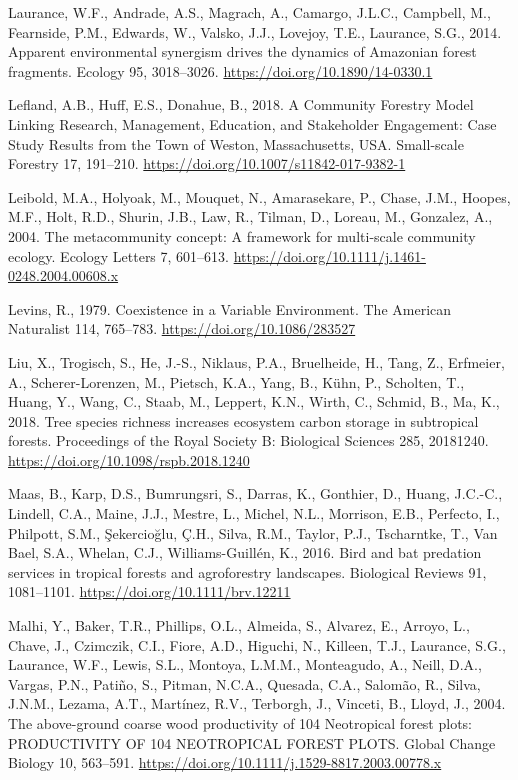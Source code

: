 \documentclass[
  12pt,
]{article}
\newlength{\cslhangindent}
\newlength{\cslentryspacingunit} %
\newenvironment{CSLReferences}[2] %
 {%
  \setlength{\parindent}{0pt}
  \ifodd #1
  \let\oldpar\par
  \def\par{\hangindent=\cslhangindent\oldpar}
  \fi
  \setlength{\parskip}{#2\cslentryspacingunit}
 }%
 {}
\begin{document}
\begin{CSLReferences}{1}{0}
\leavevmode{}%
Laurance, W.F., Andrade, A.S., Magrach, A., Camargo, J.L.C., Campbell, M., Fearnside, P.M., Edwards, W., Valsko, J.J., Lovejoy, T.E., Laurance, S.G., 2014. Apparent environmental synergism drives the dynamics of {Amazonian} forest fragments. Ecology 95, 3018--3026. \url{https://doi.org/10.1890/14-0330.1}

\leavevmode{}%
Lefland, A.B., Huff, E.S., Donahue, B., 2018. A {Community Forestry Model Linking Research}, {Management}, {Education}, and {Stakeholder Engagement}: {Case Study Results} from the {Town} of {Weston}, {Massachusetts}, {USA}. Small-scale Forestry 17, 191--210. \url{https://doi.org/10.1007/s11842-017-9382-1}

\leavevmode{}%
Leibold, M.A., Holyoak, M., Mouquet, N., Amarasekare, P., Chase, J.M., Hoopes, M.F., Holt, R.D., Shurin, J.B., Law, R., Tilman, D., Loreau, M., Gonzalez, A., 2004. The metacommunity concept: {A} framework for multi-scale community ecology. Ecology Letters 7, 601--613. \url{https://doi.org/10.1111/j.1461-0248.2004.00608.x}

\leavevmode{}%
Levins, R., 1979. Coexistence in a {Variable Environment}. The American Naturalist 114, 765--783. \url{https://doi.org/10.1086/283527}

\leavevmode{}%
Liu, X., Trogisch, S., He, J.-S., Niklaus, P.A., Bruelheide, H., Tang, Z., Erfmeier, A., Scherer-Lorenzen, M., Pietsch, K.A., Yang, B., Kühn, P., Scholten, T., Huang, Y., Wang, C., Staab, M., Leppert, K.N., Wirth, C., Schmid, B., Ma, K., 2018. Tree species richness increases ecosystem carbon storage in subtropical forests. Proceedings of the Royal Society B: Biological Sciences 285, 20181240. \url{https://doi.org/10.1098/rspb.2018.1240}

\leavevmode{}%
Maas, B., Karp, D.S., Bumrungsri, S., Darras, K., Gonthier, D., Huang, J.C.-C., Lindell, C.A., Maine, J.J., Mestre, L., Michel, N.L., Morrison, E.B., Perfecto, I., Philpott, S.M., Şekercioğlu, Ç.H., Silva, R.M., Taylor, P.J., Tscharntke, T., Van Bael, S.A., Whelan, C.J., Williams-Guillén, K., 2016. Bird and bat predation services in tropical forests and agroforestry landscapes. Biological Reviews 91, 1081--1101. \url{https://doi.org/10.1111/brv.12211}

\leavevmode{}%
Malhi, Y., Baker, T.R., Phillips, O.L., Almeida, S., Alvarez, E., Arroyo, L., Chave, J., Czimczik, C.I., Fiore, A.D., Higuchi, N., Killeen, T.J., Laurance, S.G., Laurance, W.F., Lewis, S.L., Montoya, L.M.M., Monteagudo, A., Neill, D.A., Vargas, P.N., Patiño, S., Pitman, N.C.A., Quesada, C.A., Salomão, R., Silva, J.N.M., Lezama, A.T., Martínez, R.V., Terborgh, J., Vinceti, B., Lloyd, J., 2004. The above-ground coarse wood productivity of 104 {Neotropical} forest plots: {PRODUCTIVITY OF} 104 {NEOTROPICAL FOREST PLOTS}. Global Change Biology 10, 563--591. \url{https://doi.org/10.1111/j.1529-8817.2003.00778.x}


\end{CSLReferences}
\end{document}
